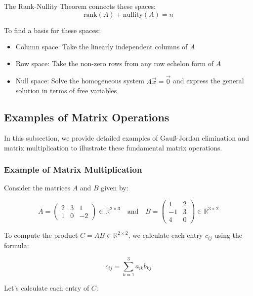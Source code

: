 The Rank-Nullity Theorem connects these spaces:
\begin{equation*}
\text{rank}(A) + \text{nullity}(A) = n
\end{equation*}

To find a basis for these spaces:
\begin{itemize}[label=\(-\)]
    \item Column space: Take the linearly independent columns of \(A\)
    \item Row space: Take the non-zero rows from any row echelon form of \(A\)
    \item Null space: Solve the homogeneous system \(A\vec{x} = \vec{0}\) and express the general solution in terms of free variables
\end{itemize}
\subsection{Examples of Matrix Operations}

In this subsection, we provide detailed examples of Gauß-Jordan elimination and matrix multiplication to illustrate these fundamental matrix operations.

\subsubsection{Example of Matrix Multiplication}

Consider the matrices \(A\) and \(B\) given by:

\begin{equation*}
A = 
\begin{pmatrix}
2 & 3 & 1 \\
1 & 0 & -2
\end{pmatrix} \in \mathbb{R}^{2 \times 3}
\quad \text{and} \quad
B = 
\begin{pmatrix}
1 & 2 \\
-1 & 3 \\
4 & 0
\end{pmatrix} \in \mathbb{R}^{3 \times 2}
\end{equation*}

To compute the product \(C = AB \in \mathbb{R}^{2 \times 2}\), we calculate each entry \(c_{ij}\) using the formula:

\begin{equation*}
c_{ij} = \sum_{k=1}^{3} a_{ik} b_{kj}
\end{equation*}

Let's calculate each entry of \(C\):


